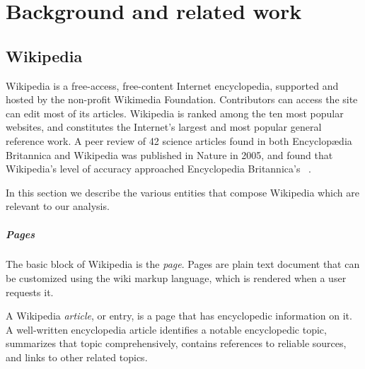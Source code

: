 
\chapter{Background and related work}
\label{cha:background}


\section{Wikipedia}
\label{sec:wiki}
Wikipedia is a free-access, free-content Internet encyclopedia, supported and hosted by the non-profit Wikimedia Foundation.
Contributors can access the site can edit most of its articles.
Wikipedia is ranked among the ten most popular websites, and constitutes the Internet's largest and most popular general reference work.
A peer review of 42 science articles found in both Encyclopædia Britannica and Wikipedia was published in Nature in 2005, and found that Wikipedia's level of accuracy approached Encyclopedia Britannica's~\cite{Giles2005} .


In this section we describe the various entities that compose Wikipedia which are relevant to our analysis.

\paragraph{Pages}
The basic block of Wikipedia is the \emph{page}.
Pages are plain text document that can be customized using the wiki markup language, which is rendered when a user requests it.

A Wikipedia \emph{article}, or entry, is a page that has encyclopedic information on it.
A well-written encyclopedia article identifies a notable encyclopedic topic, summarizes that topic comprehensively, contains references to reliable sources, and links to other related topics.


